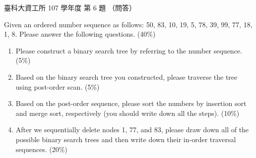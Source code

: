 \begin{pastexam}[label={px:ntust-107-ice-06}]{臺科大資工所 107 學年度 第 6 題}
（問答）

Given an ordered number sequence as follows: 50, 83, 10, 19, 5, 78, 39, 99, 77, 18, 1, 8.
Please answer the following questions. (40\%)
\begin{enumerate}[label=(\alph*)]
\item Please construct a binary search tree by referring to the number sequence. (5\%)
\item Based on the binary search tree you constructed, please traverse the tree using post-order
scan. (5\%)
\item Based on the post-order sequence, please sort the numbers by insertion sort and merge sort,
respectively (you should write down all the steps). (10\%)
\item After we sequentially delete nodes 1, 77, and 83, please draw down all of the possible
binary search trees and then write down their in-order traversal sequences. (20\%)
\end{enumerate}
\end{pastexam}

